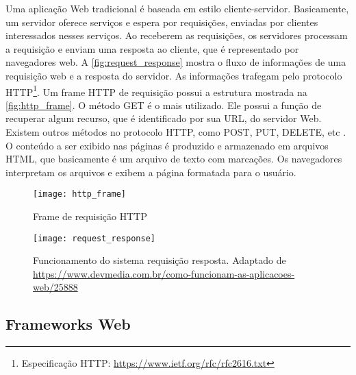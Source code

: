 		Uma aplicação Web tradicional é baseada em estilo cliente-servidor. Basicamente, um servidor oferece serviços e espera por requisições, enviadas por clientes interessados nesses serviços. Ao receberem as requisições, os servidores processam a requisição e enviam uma resposta ao cliente, que é representado por navegadores web. A \autoref{fig:request_response} mostra o fluxo de informações de uma requisição web e a resposta do servidor. As informações trafegam pelo protocolo HTTP\footnote{Especificação HTTP: \url{https://www.ietf.org/rfc/rfc2616.txt}}. Um frame HTTP de requisição possui a estrutura mostrada na \autoref{fig:http_frame}. O método GET é o mais utilizado. Ele possui a função de recuperar algum recurso, que é identificado por sua URL, do servidor Web. Existem outros métodos no protocolo HTTP, como POST, PUT, DELETE, etc \cite{diego2016}. O conteúdo a ser exibido nas páginas é produzido e armazenado em arquivos HTML, que basicamente é um arquivo de texto com marcações. Os navegadores interpretam os arquivos e exibem a página formatada para o usuário.
		
		\begin{figure}[!htb]	
			\captionsetup{justification=centering}
			\begin{center}
				\texttt{[image: http\_frame]}  %
				\caption[Frame de requisição HTTP]{\label{fig:http_frame} Frame de requisição HTTP}
			\end{center}		
		\end{figure}
	
		\begin{figure}[!htb]	
			\captionsetup{justification=centering}
			\begin{center}
				\texttt{[image: request\_response]}  %
				\caption[Funcionamento do sistema requisição resposta.]{\label{fig:request_response} Funcionamento do sistema requisição resposta. Adaptado de \url{https://www.devmedia.com.br/como-funcionam-as-aplicacoes-web/25888}}
			\end{center}		
		\end{figure}
		
	\subsection{Frameworks Web}
		
		